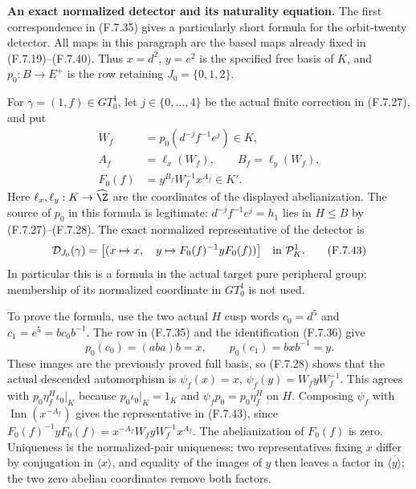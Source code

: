 \medskip\noindent\textbf{An exact normalized detector and its naturality equation.}
The first correspondence in (F.7.35) gives a particularly
short formula for the orbit-twenty detector.  All maps
in this paragraph are the based maps already fixed in
(F.7.19)--(F.7.40).  Thus $x=d^2$, $y=e^2$ is the
specified free basis of $K$, and $p_0:B\to E^+$ is the
row retaining $J_0=\{0,1,2\}$.

For $\gamma=(1,f)\in GT_0^1$, let $j\in\{0,\ldots,4\}$
be the actual finite correction in (F.7.27), and put
\[
 \begin{split}
 W_f&=p_0(d^{-j}f^{-1}e^j)\in K,\\
 A_f&=\ell_x(W_f),\qquad B_f=\ell_y(W_f),\\
 F_0(f)&=y^{B_f}W_f^{-1}x^{A_f}\in K'.
 \end{split}                                                   \tag{F.7.42}
\]
Here $\ell_x,\ell_y:K\to\widehat\Z$ are the
coordinates of the displayed abelianization.
The source of $p_0$ in this formula is legitimate:
$d^{-j}f^{-1}e^j=h_1$ lies in $H\leq B$ by
(F.7.27)--(F.7.28).
The exact normalized representative of the detector is
\[
 \mathcal D_{J_0}(\gamma)
       =\bigl[(x\mapsto x,\quad
                   y\mapsto F_0(f)^{-1}yF_0(f))\bigr]
                    \quad\hbox{in }\mathcal P_K^1.              \tag{F.7.43}
\]
In particular this is a formula in the actual target
pure peripheral group; membership of its normalized
coordinate in $GT_0^1$ is not used.

To prove the formula, use the two actual $H$ cusp
words $c_0=d^5$ and $c_1=e^5=b c_0b^{-1}$.
The row in (F.7.35) and the identification (F.7.36)
give
\[
       p_0(c_0)=(aba)b=x,\qquad
       p_0(c_1)=bxb^{-1}=y .
\]
These images are the previously proved full basis,
so (F.7.28) shows that the actual descended
automorphism is
$\psi_f(x)=x$, $\psi_f(y)=W_fyW_f^{-1}$.
This agrees with $p_0\eta_f^H\iota_0|_K$ because
$p_0\iota_0|_K=1_K$ and $\psi_fp_0=p_0\eta_f^H$
on $H$.  Composing $\psi_f$ with
$\operatorname{Inn}(x^{-A_f})$ gives the representative
in (F.7.43), since
$F_0(f)^{-1}yF_0(f)=
x^{-A_f}W_fyW_f^{-1}x^{A_f}$.
The abelianization of $F_0(f)$ is zero.
Uniqueness is the normalized-pair uniqueness:
two representatives fixing $x$ differ by conjugation
in $\overline{\langle x\rangle}$, and equality of the
images of $y$ then leaves a factor in
$\overline{\langle y\rangle}$; the two zero
abelian coordinates remove both factors.

